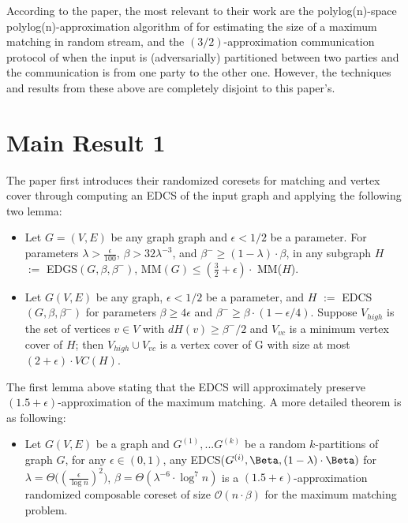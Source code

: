 \documentclass[12pt]{report}
\begin{document}
{According to the paper, the most relevant to their work are the polylog(n)-space polylog(n)-approximation algorithm of 
for estimating the size of a maximum matching in random stream, and the $(3/2)$-approximation
communication protocol of when the input is (adversarially) partitioned between two parties
and the communication is from one party to the other one. However, the techniques and results from these above are completely disjoint to this paper's.
\\

\section{Main Result 1}
The paper first introduces their randomized coresets for matching and vertex cover through computing an EDCS of the input graph and applying the following two lemma:
\begin{itemize}
    \item Let $G = (V,E)$ be any graph  graph and $\epsilon < 1/2$ be a parameter. For parameters $\lambda > \frac{\epsilon}{100}$, $\beta > 32\lambda^{-3}$, and $\beta^- \geq (1 - \lambda) \cdot \beta$, in any subgraph $H$ $:=$ EDGS$(G,\beta,\beta^-)$, MM$(G) \leq (\frac{3}{2} + \epsilon) \cdot$ MM($H$).
    \item  Let $G(V, E)$ be any graph, $\epsilon < 1/2$ be a parameter, and $H$ $:=$ EDCS$(G, \beta, \beta^-)$ for parameters $\beta \geq 4\epsilon$ and $\beta^- \geq \beta \cdot (1 - \epsilon/4)$. Suppose $V_{high}$ is the set of vertices $v \in V$ with $dH (v) \geq \beta^-/2$ and $V_{vc}$ is a minimum vertex cover of $H$; then $V_{high} \cup V_{vc}$ is a vertex cover of G with size at most $(2 + \epsilon) \cdot VC(H)$.
\end{itemize}

The first lemma above stating that the EDCS will approximately preserve $(1.5 + \epsilon)$-approximation of the maximum matching. A more detailed theorem is as following:

\begin{itemize}
    \item Let $G(V,E)$ be a graph and $G^{(1)},...G^{(k)}$ be a random $k$-partitions of graph $G$, for any $\epsilon \in (0,1)$, any EDCS($G^{(i)}, \Beta, (1- \lambda)\cdot\Beta)$ for $\lambda = \Theta \bigg((\frac{\epsilon}{\log {n}})^2 \bigg)$, $ \beta = \Theta(\lambda^{-6}\cdot\log^7{n})$  is a $(1.5 + \epsilon)$-approximation randomized composable coreset of size $\mathcal{O}(n \cdot \beta)$ for the maximum matching problem.
\end{itemize}

}
\end{document}
